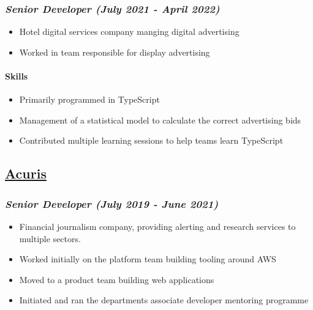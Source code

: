 \hypertarget{senior-developer-july-2021---april-2022}{%
\subsubsection{\texorpdfstring{\emph{Senior Developer (July 2021 - April
2022)}}{Senior Developer (July 2021 - April 2022)}}\label{senior-developer-july-2021---april-2022}}

\begin{itemize}
\tightlist
\item
  Hotel digital services company manging digital advertising
\item
  Worked in team responsible for display advertising
\end{itemize}

\hypertarget{skills-triptease}{%
\paragraph{Skills}\label{skills-triptease}}

\begin{itemize}
\tightlist
\item
  Primarily programmed in TypeScript
\item
  Management of a statistical model to calculate the correct advertising
  bids
\item
  Contributed multiple learning sessions to help teams learn TypeScript
\end{itemize}

\hypertarget{acuris}{%
\subsection{\texorpdfstring{\href{http://www.acuris.com/}{Acuris}}{Acuris}}\label{acuris}}

\hypertarget{senior-developer-june-2019---present}{%
\subsubsection{\texorpdfstring{\emph{Senior Developer (July 2019 - June
2021)}}{Senior Developer (July 2019 - June 2021)}}\label{senior-developer-june-2019---present}}

\begin{itemize}
\tightlist
\item
  Financial journalism company, providing alerting and research services
  to multiple sectors.
\item
  Worked initially on the platform team building tooling around AWS
\item
  Moved to a product team building web applications
\item
  Initiated and ran the departments associate developer mentoring
  programme
\end{itemize}


